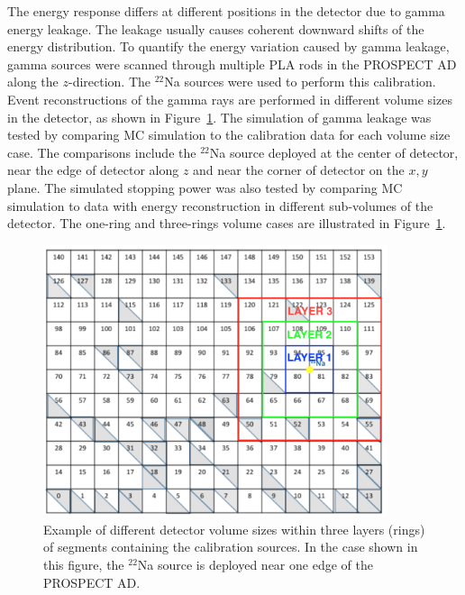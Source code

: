 The energy response differs at different positions in the detector due to gamma energy leakage.
The leakage usually causes coherent downward shifts of the energy distribution.
To quantify the energy variation caused by gamma leakage, gamma sources were scanned through multiple PLA rods in the PROSPECT AD along the $z$-direction.
The $^{22}$Na sources were used to perform this calibration.
Event reconstructions of the gamma rays are performed in different volume sizes in the detector, as shown in Figure~\ref{fig:ring}.
The simulation of gamma leakage was tested by comparing MC simulation to the calibration data for each volume size case.
The comparisons include the $^{22}$Na source deployed at the center of detector, near the edge of detector along $z$ and near the corner of detector on the $x, y$ plane.
The simulated stopping power was also tested by comparing MC simulation to data with energy reconstruction in different sub-volumes of the detector.
The one-ring and three-rings volume cases are illustrated in Figure~\ref{fig:ring}.
\begin{figure}[h!]
\centering
\includegraphics[width=0.9\textwidth]{Figures/Ring.png}
\caption[Example of different volume sizes within three layers of segments.]{Example of different detector volume sizes within three layers (rings) of segments containing the calibration sources. In the case shown in this figure, the $^{22}$Na source is deployed near one edge of the PROSPECT AD.}
\label{fig:ring}
\end{figure}

